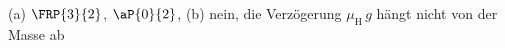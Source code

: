 (a) $\FRP{3}{2}$, $\aP{0}{2}$, (b) nein, die Verzögerung $\mu_\mathrm{H}\,g$ hängt nicht von der Masse ab

